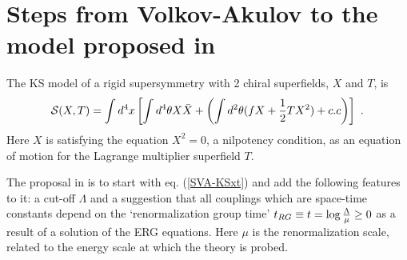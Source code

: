 \documentclass[11pt]{article}
\newcommand{\be}{\begin{equation}}
\newcommand{\ee}{\end{equation}}
\newcommand{\rf}[1]{(\ref{#1})}
\def\be{\begin{equation}}
\def\ee{\end{equation}}
\newcommand{\lp}{\left(}
\newcommand{\rp}{\right)}
\newcommand{\ls}{\left[}
\newcommand{\rs}{\right]}
\begin{document}
\section{Steps from Volkov-Akulov to the model proposed in \cite{DallAgata:2022abm}}\label{appC}

The KS model of a rigid supersymmetry \cite{Komargodski:2009rz} with 2 chiral superfields, $X$ and $T$, is
\be
 {\cal S} (X, T) = \int d^4 x \ls \int d^4\theta X\bar X + \lp\int d^2 \theta (fX + {1\over 2} TX^2) + c.c\rp \rs \ .
\label{SVA-KSxt}\ee
Here $X$ is satisfying the equation $X^2=0$, a nilpotency condition, as an equation of motion for the Lagrange multiplier superfield $T$. 

The proposal in \cite{DallAgata:2022abm} is to start with eq. \rf{SVA-KSxt} and add the following features to it: a cut-off $\Lambda$ and a suggestion that all couplings which are space-time constants depend on the `renormalization group time'  $
t_{RG}\equiv t= \log {\Lambda\over \mu} \geq 0
$
as a result of a solution of the ERG equations. Here $\mu$ is the  renormalization scale, related to the energy scale at which the theory is probed.
\end{document}
